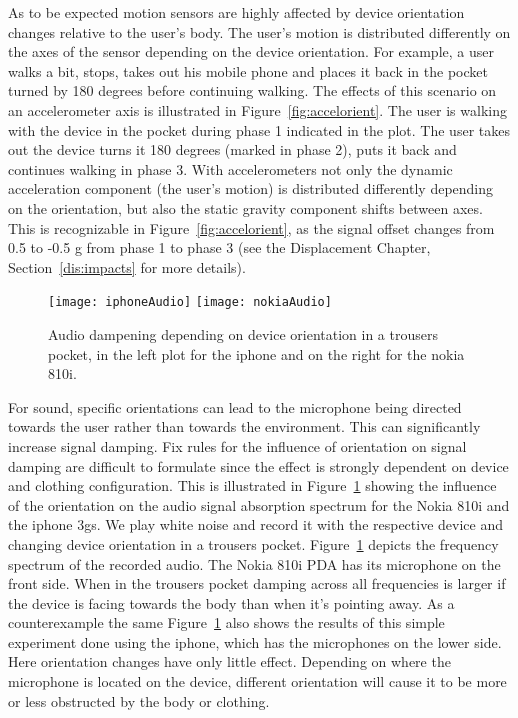 As to be expected motion sensors are highly affected by device
orientation changes relative to the user's body. 
The user's motion is distributed differently on the axes of the sensor depending on the
device orientation. For example, a user walks a bit, stops, takes out his mobile phone and 
places it back in the pocket turned by 180 degrees before continuing walking. 
The effects of this scenario on an accelerometer axis is illustrated in Figure~\ref{fig:accelorient}.
The user is walking with the device in the pocket during phase 1 indicated in the plot. 
The user takes out the device turns it 180 degrees (marked in phase 2), puts it back and continues walking in phase 3. 
With accelerometers not only the dynamic acceleration component (the user's motion) is distributed differently depending on
the orientation, but also the static gravity component shifts between axes. This is recognizable in Figure~\ref{fig:accelorient},
as the signal offset changes from 0.5 to -0.5 g from phase 1 to phase 3 (see the Displacement Chapter,
Section~\ref{dis:impacts} for more details).


\begin{figure}[t]
  \begin{center}
  \texttt{[image: iphoneAudio]}
  \texttt{[image: nokiaAudio]}
	\end{center}
\caption[Audio dampening due to device orientation]{Audio dampening depending on device orientation in a trousers pocket, in the left plot
 for the iphone and on the right for the nokia
 810i.} \label{fig:orientation_audio} \end{figure}

For sound, specific orientations can lead
to the microphone being directed towards the user rather than towards
the environment. This can significantly increase signal damping. Fix rules for the influence of orientation on signal damping are
difficult to formulate since the effect is strongly dependent on
device and clothing configuration. This is
illustrated in Figure~\ref{fig:orientation_audio} showing the influence of
the orientation on the audio signal absorption spectrum for the Nokia
810i and the iphone 3gs. We play white noise and record it with the respective device 
and changing device orientation in a trousers pocket. Figure~\ref{fig:orientation_audio} depicts the
frequency spectrum of the recorded audio. The Nokia 810i PDA
has its microphone on the front side. When in the trousers pocket
damping across all frequencies is larger if the device is facing
towards the body than when it's pointing away. As a counterexample
the same Figure~\ref{fig:orientation_audio} also shows the results of
this simple experiment done using the iphone, which has the microphones
on the lower side. Here orientation changes have only little effect.
Depending on where the microphone is located on the device, different orientation will
cause it to be more or less obstructed by the body or clothing.

